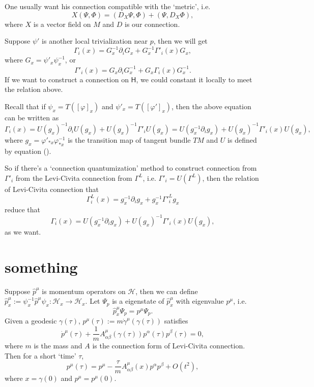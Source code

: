 \documentclass[12pt]{extarticle}
\theoremstyle{definition}
\theoremstyle{plain}
\begin{document}
One usually want his connection compatible with the `metric', i.e.
\[
	X(\Psi,\Phi)=(D_X\Psi,\Phi)+(\Psi,D_X\Phi),
\]
where $X$ is a vector field on $M$ and $D$ is our connection.

Suppose $\psi'$ is another local trivialization near $p$, then we will get
\[
	\Gamma_i(x)=G_x^{-1}\partial_i G_x+G^{-1}_x\Gamma'_i(x)G_x,
\]
where $G_x=\psi'_x\psi^{-1}_x$, or 
\[
	\Gamma'_i(x)=G_x\partial_i G_x^{-1}+G_x\Gamma_i(x)G_x^{-1}.
\]
If we want to construct a connection on $\mathsf H$, we could constant it locally to meet the relation above.

Recall that if $\psi_x=T([\varphi]_x)$ and $\psi'_x=T([\varphi']_x)$, then the above equation can be written as
\[
	\Gamma_i(x)=U(g_x)^{-1}\partial_iU(g_x)+U(g_x)^{-1}\Gamma'_iU(g_x)=U(g_x^{-1}\partial_ig_x)+U(g_x)^{-1}\Gamma'_i(x)U(g_x),
\]
where $g_x=\varphi'_{*x}\varphi_{*x}^{-1}$ is the transition map of tangent bundle $TM$ and $U$ is defined by equation (\theequation).

So if there's a `connection quantumization' method to construct connection from $\Gamma'_i$ from the Levi-Civita connection from $\Gamma^L$, i.e. $\Gamma'_i=U(\Gamma^L)$, then the relation of Levi-Civita connection that
\[
	\Gamma^L_i(x)=g_x^{-1}\partial_ig_x+g_x^{-1}{\Gamma'}^L_ig_x
\]
reduce that
\[
	\Gamma_i(x)=U(g_x^{-1}\partial_ig_x)+U(g_x)^{-1}\Gamma'_i(x)U(g_x),
\]
as we want.

\section{something}

Suppose $\hat p^\mu$ is momentum operators on $\mathcal H$, then we can define $\hat p^\mu_x:=\psi_x^{-1}\hat p^\mu\psi_x:\mathcal H_x\to \mathcal H_x$. Let $\Psi_{p}$ is a eigenstate of $\hat p^\mu_x$ with eigenvalue $p^\mu$, i.e.
\[
	\hat p^\mu_x\Psi_{p}=p^\mu\Psi_{p}.
\]
Given a geodesic $\gamma(\tau)$, $p^\mu(\tau):=m\dot\gamma^\mu(\gamma(\tau))$ satisfies
\[
	\dot p^\mu(\tau)+\frac{1}{m}A^\mu_{\alpha\beta}(\gamma(\tau))p^\alpha(\tau)p^\beta(\tau)=0,
\]
where $m$ is the mass and $A$ is the connection form of Levi-Civita connection. Then for a short `time' $\tau$,
\[
	p^\mu(\tau)=p^\mu-\frac{\tau}{m}A^\mu_{\alpha\beta}(x)p^\alpha p^\beta +O(t^2),
\]
where $x=\gamma(0)$ and $p^\mu=p^\mu(0)$.
\end{document}
